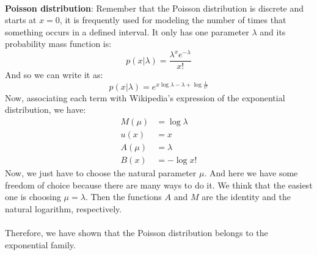 \documentclass[10pt]{article}
\begin{document}
\newpage
\ \\
\Large{\textbf{Poisson distribution}}:
\Large
Remember that the Poisson distribution is discrete and starts at $x=0$, it is frequently used for modeling the number of times that something occurs in a defined interval. It only has one parameter $\lambda$ and its probability mass function is:
$$
p(x|\lambda)= \frac{\lambda^x e^{-\lambda}}{x!}
$$
And so we can write it as:
$$
p(x|\lambda)= e^{x\log \lambda - \lambda + \log \frac{1}{x!}}
$$
Now, associating each term with Wikipedia's expression of the exponential distribution, we have:
\begin{equation*}
\begin{split}
   M(\mu) &=\log \lambda \\
   u(x)   &=x  \\
   A(\mu) &=\lambda \\
   B(x)   &= -\log x!
\end{split}
\end{equation*}
Now, we just have to choose the natural parameter $\mu$. And here we have some freedom of choice because there are many ways to do it. We think that the easiest one is choosing $\mu=\lambda$. Then the functions $A$ and $M$ are the identity and the natural logarithm, respectively. \\ \ \\
Therefore, we have shown that the Poisson distribution belongs to the exponential family.
\end{document}
